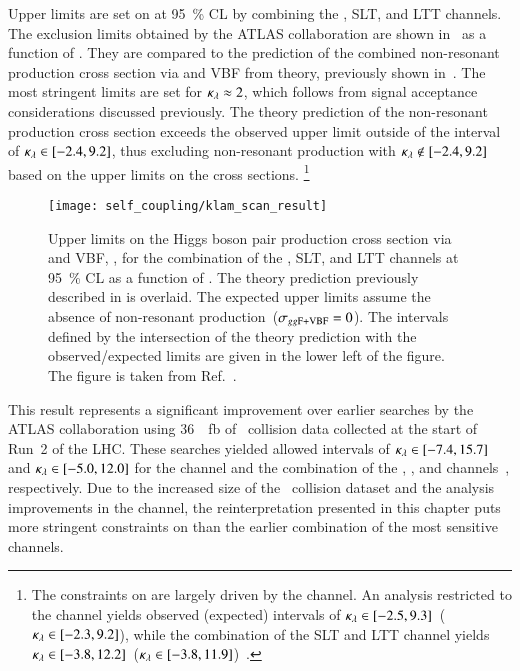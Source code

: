 Upper limits are set on \xsecggfvbf at \SI{95}{\percent} CL by combining the
\hadhad, \lephad SLT, and \lephad LTT channels. The exclusion limits obtained by
the ATLAS collaboration are shown in~ as a function of
\klambda. They are compared to the prediction of the combined non-resonant \HH
production cross section via \ggF and VBF from theory, previously shown
in~. The most stringent limits are set for
$\kappa_{\lambda} \approx 2$, which follows from signal acceptance considerations
discussed previously. The theory prediction of the non-resonant \HH production
cross section exceeds the observed upper limit outside of the interval of
\mbox{$\kappa_{\lambda} \in [-2.4, 9.2]$}, thus excluding non-resonant \HH production
with \mbox{$\kappa_{\lambda} \notin [-2.4, 9.2]$} based on the upper limits on the cross
sections.%
\footnote{The constraints on \klambda are largely driven by the \hadhad
  channel. An analysis restricted to the \hadhad channel yields observed
  (expected) \klambda intervals of $\kappa_{\lambda} \in [ -2.5, 9.3
  ]$~($\kappa_{\lambda} \in [ -2.3, 9.2 ]$), while the combination of the \lephad SLT
  and LTT channel yields $\kappa_{\lambda} \in [ -3.8, 12.2
  ]$~($\kappa_{\lambda} \in [ -3.8, 11.9 ]$)~\cite{Dimitriadi}.}

\begin{figure}[htbp]
  \centering

  \texttt{[image: self\_coupling/klam\_scan\_result]}

  \caption{Upper limits on the Higgs boson pair production cross
    section via \ggF and VBF, \xsecggfvbf, for the combination of the
    \hadhad, \lephad SLT, and \lephad LTT channels at
    \SI{95}{\percent} CL as a function of \klambda. The theory
    prediction previously described in  is
    overlaid. The expected upper limits assume the absence of
    non-resonant \HH production~($\sigma_{gg\text{F+VBF}} = 0$). The \klambda
    intervals defined by the intersection of the theory prediction
    with the observed/expected limits are given in the lower left of
    the figure. The figure is taken from
    Ref.~\cite{ATLAS-CONF-2021-052}.}%
  \label{fig:klambda_scan}
\end{figure}

This result represents a significant improvement over earlier searches by the
ATLAS collaboration using \SI{36}{\per\femto\barn} of \pp~collision data
collected at the start of Run~2 of the LHC. These searches yielded allowed
\klambda intervals of \mbox{$\kappa_{\lambda} \in [-7.4, 15.7]$} and
\mbox{$\kappa_{\lambda} \in [-5.0, 12.0]$} for the \bbtautau channel and the combination
of the \bbbb, \bbtautau, and \bbyy channels~\cite{HDBS-2018-58},
respectively. Due to the increased size of the \pp~collision dataset and the
analysis improvements in the \bbtautau channel, the reinterpretation presented
in this chapter puts more stringent constraints on \klambda than the earlier
combination of the most sensitive channels.


